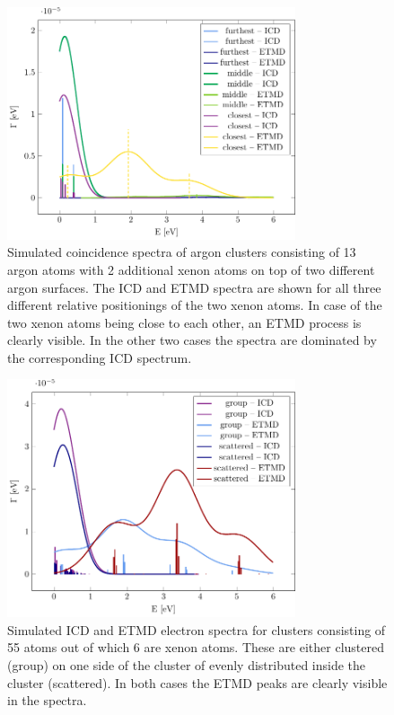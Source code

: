 \begin{figure}[h]
 \centering
 \includegraphics[width=8.5cm]{pics/2tops.pdf}
 \caption{Simulated coincidence spectra of argon clusters consisting of 13
          argon atoms with 2 additional xenon atoms on top of two different
          argon surfaces. The ICD and ETMD spectra are shown for all three
          different relative positionings of the two xenon atoms. In case of
          the two xenon atoms being close to each other, an ETMD process is
          clearly visible. In the other two cases the spectra are dominated by
          the corresponding ICD spectrum.}
 \label{figure:2tops}
\end{figure}


\begin{figure}[h]
 \centering
 \includegraphics[width=8.5cm]{pics/ar_3_6in.pdf}
 \caption{Simulated ICD and ETMD electron spectra for clusters consisting of
          55 atoms out of which 6 are xenon atoms. These are either clustered
          (group) on one side of the cluster of evenly distributed
          inside the cluster (scattered). In both cases the ETMD peaks are
          clearly visible in the spectra.}
 \label{figure:ar_3_6in}
\end{figure}


